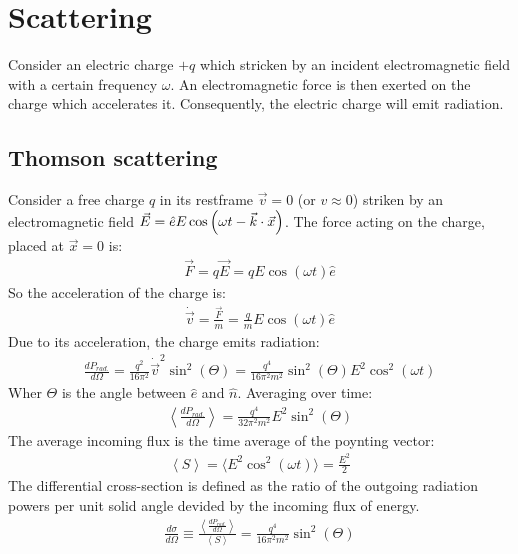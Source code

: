 \section{Scattering}

Consider an electric charge $+q$ which stricken by an incident electromagnetic
field with a certain frequency $\omega$. An electromagnetic force is then exerted
on the charge which accelerates it. Consequently, the electric charge will emit
radiation.

\subsection{Thomson scattering}

Consider a free charge $q$ in its restframe $\vec{v} = 0$ (or $v \approx 0$)
striken by an electromagnetic field $\vec{E} = \hat{e} E \cos
\left( \omega t - \vec{k} \cdot \vec{x} \right)$. The force acting on the charge,
placed at $\vec{x} =0$ is:
\begin{align*}
    \vec{F} = q \vec{E} = q E \cos(\omega t) \hat{e}
\end{align*}
So the acceleration of the charge is:
\begin{align*}
    \dot{\vec{v}} = \frac{\vec{F}}{m} = \frac{q}{m} E \cos(\omega t) \hat{e}
\end{align*}
Due to its acceleration, the charge emits radiation:
\begin{align*}
    \frac{d P_{rad.}}{d \Omega} = \frac{q^2}{16 \pi^2} \dot{\vec{v}}^2 \sin^2 (\Theta)
    = \frac{q^4}{16 \pi^2 m^2} \sin^2(\Theta) E^2 \cos^2(\omega t)
\end{align*}
Wher $\Theta$ is the angle between $\hat{e}$ and $\hat{n}$.
Averaging over time:
\begin{align*}
    \left\langle \frac{d P_{rad.}}{d \Omega} \right\rangle
    = \frac{q^4}{32 \pi^2 m^2} E^2 \sin^2(\Theta)
\end{align*}
The average incoming flux is the time average of the poynting vector:
\begin{align*}
    \left\langle S \right\rangle
    = \langle E^2 \cos^2(\omega t) \rangle
    = \frac{E^2}{2}
\end{align*}
The differential cross-section is defined as the ratio of the outgoing
radiation powers per unit solid angle devided by the incoming flux of energy.
\begin{align*}
    \frac{d \sigma}{d \Omega} \equiv \frac{\left\langle \frac{d P_{rad.}}{d \Omega} \right\rangle}{\left\langle S \right\rangle}
    = \frac{q^4}{16 \pi^2 m^2} \sin^2(\Theta)
\end{align*}

